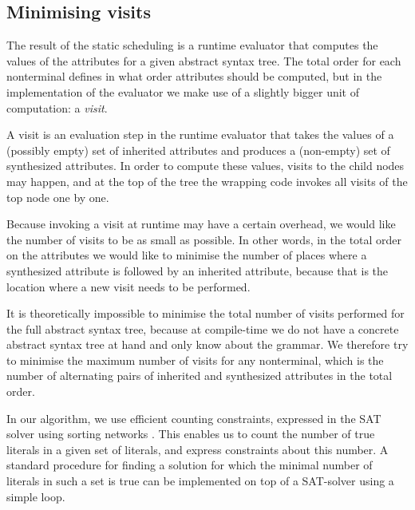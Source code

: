 \documentclass{llncs}
\begin{document}
\subsection{Minimising visits} \label{sect:minimising}
The result of the static scheduling is a runtime evaluator that computes the values of the attributes for a given abstract syntax tree. The total order for each nonterminal defines in what order attributes should be computed, but in the implementation of the evaluator we make use of a slightly bigger unit of computation: a \emph{visit}.

A visit is an evaluation step in the runtime evaluator that takes the values of a (possibly empty) set of inherited attributes and produces a (non-empty) set of synthesized attributes. In order to compute these values, visits to the child nodes may happen, and at the top of the tree the wrapping code invokes all visits of the top node one by one.

Because invoking a visit at runtime may have a certain overhead, we would like the number of visits to be as small as possible. In other words, in the total order on the attributes we would like to minimise the number of places where a synthesized attribute is followed by an inherited attribute, because that is the location where a new visit needs to be performed.

It is theoretically impossible to minimise the total number of visits performed for the full abstract syntax tree, because at compile-time we do not have a concrete abstract syntax tree at hand and only know about the grammar. We therefore try to minimise the maximum number of visits for any nonterminal, which is the number of alternating pairs of inherited and synthesized attributes in the total order.

In our algorithm, we use efficient counting constraints, expressed in the SAT solver using sorting networks \cite{counting-sorting}. This enables us to count the number of true literals in a given set of literals, and express constraints about this number. A standard procedure for finding a solution for which the minimal number of literals in such a set is true can be implemented on top of a SAT-solver using a simple loop.
\end{document}
